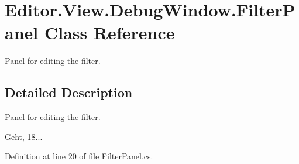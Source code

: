 \section{Editor.\-View.\-Debug\-Window.\-Filter\-Panel Class Reference}
\label{class_editor_1_1_view_1_1_debug_window_1_1_filter_panel}


Panel for editing the filter.  




\subsection{Detailed Description}
Panel for editing the filter. 

Geht, 18... 

Definition at line 20 of file Filter\-Panel.\-cs.

